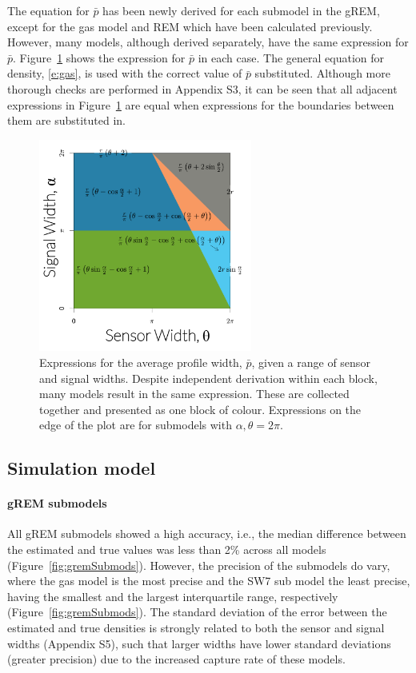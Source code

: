 The equation for $\bar{p}$ has been newly derived for each submodel in the gREM, except for the gas model and REM which have been calculated previously.
However, many models, although derived separately, have the same expression for $\bar{p}$.
Figure~\ref{f:equalModelResults} shows the expression for $\bar{p}$ in each case.
The general equation for density, \ref{e:gas}, is used with the correct value of $\bar{p}$ substituted.
Although more thorough checks are performed in Appendix S3, it can be seen that all adjacent expressions in Figure~\ref{f:equalModelResults} are equal when expressions for the boundaries between them are substituted in.






\begin{figure}
	\centering
	\includegraphics[width=7cm]{imgs/equalRegionsExpressions.pdf}
	\caption[Expressions for the average profile width]{
Expressions for the average profile width, $\bar{p}$, given a range of sensor and signal widths.
Despite independent derivation within each block, many models result in the same expression.
These are collected together and presented as one block of colour.
Expressions on the edge of the plot are for submodels with $\alpha, \theta = 2\pi$. }
	\label{f:equalModelResults}
\end{figure}


\subsection{Simulation model}

\paragraph{gREM submodels}
All gREM submodels showed a high accuracy, i.e., the median difference between the estimated and true values was less than 2\% across all models (Figure~\ref{fig:gremSubmods}).
However, the precision of the submodels do vary, where the gas model is the most precise and the SW7 sub model the least precise, having the smallest and the largest interquartile range, respectively (Figure~\ref{fig:gremSubmods}).
The standard deviation of the error between the estimated and true densities is strongly related to both the sensor and signal widths (Appendix S5), such that larger widths have lower standard deviations (greater precision) due to the increased capture rate of these models.



